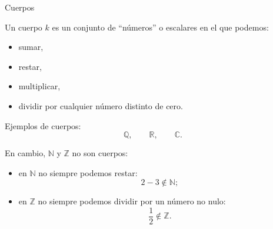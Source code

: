 \begin{frame}{Cuerpos}

Un \alert{cuerpo} $k$ es un conjunto de ``números'' o \alert{escalares} en el que podemos:

\begin{itemize}
    \item sumar,
    \item restar,
    \item multiplicar,
    \item dividir por cualquier número distinto de cero.
\end{itemize}

\medskip

Ejemplos de cuerpos:
\[
\mathbb{Q},
\qquad
\mathbb{R},
\qquad
\mathbb{C}.
\]

\medskip

En cambio, \(\mathbb{N}\) y \(\mathbb{Z}\) no son cuerpos:

\begin{itemize}
    \item en \(\mathbb{N}\) no siempre podemos restar:
    \[
    2-3\notin\mathbb{N};
    \]
    \item en \(\mathbb{Z}\) no siempre podemos dividir por un número no nulo:
    \[
    \frac{1}{2}\notin\mathbb{Z}.
    \]
\end{itemize}

\end{frame}